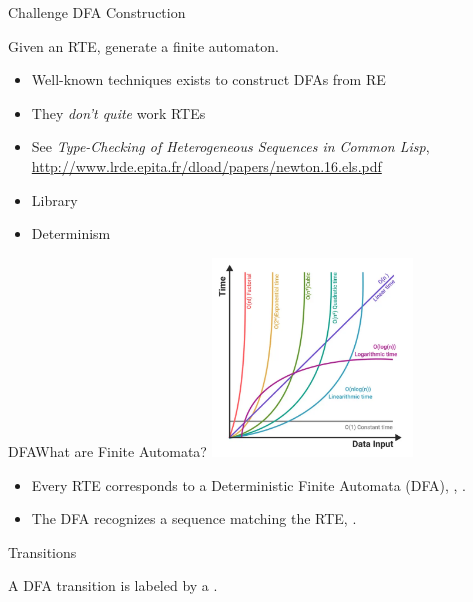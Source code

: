 {  
\begin{frame}{Challenge }{DFA Construction}

  Given an RTE, generate a finite automaton.

  \begin{itemize}
  \item Well-known techniques exists to construct DFAs from RE
  \item They \emph{don't quite} work RTEs
  \item See \emph{Type-Checking of Heterogeneous Sequences in Common Lisp},
    \url{http://www.lrde.epita.fr/dload/papers/newton.16.els.pdf}
  \item Library 
  \item Determinism
  \end{itemize}
\end{frame}

}

\begin{frame}{DFA}{What are Finite Automata?}
  \includegraphics[width=0.4\textwidth]{complexity.png}

  \begin{itemize}
  \item   Every RTE corresponds to a Deterministic Finite Automata (DFA), , .

  \item   The DFA recognizes a sequence matching the RTE, .

  \end{itemize}
\end{frame}

\begin{frame}{ Transitions}

  \scalebox{0.8}{}

  A DFA transition is labeled by a .
\end{frame}



